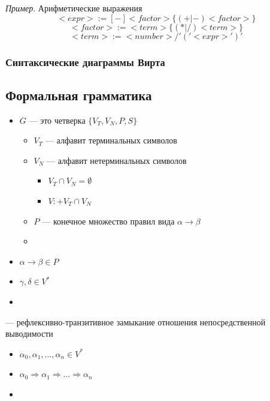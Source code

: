 \documentclass[a4paper, 14pt]{extarticle}
\begin{document}
\textit{Пример}. Арифметические выражения %
\[ <expr> := [-] <factor> \{ (+ | -) <factor> \}  \]
\[ <factor> := <term> \{ (* | /) <term> \} \]
\[ <term> := <number> / '('<expr>')' \]

\subsubsection{Синтаксические диаграммы Вирта}

\subsection{Формальная грамматика}
\begin{itemize}
    \item {} $G$ --- это четверка $\{V_T, V_N, P, S \}$
    \begin{itemize}
        \item $V_T$ --- алфавит терминальных символов
        \item $V_N$ --- алфавит нетерминальных символов
        \begin{itemize}
            \item $ V_T \cap V_N = \emptyset $
            \item $V :+ V_T \cap V_N$
        \end{itemize}
        \item $P$ --- конечное множество правил вида $\alpha \rightarrow \beta$
        \item %
    \end{itemize}
\end{itemize}

\begin{itemize}
    \item $\alpha \rightarrow \beta \in P$
    \item $\gamma, \delta \in V^*$
    \item %
\end{itemize}

 --- рефлексивно-транзитивное замыкание отношения непосредственной выводимости
\begin{itemize}
    \item $\alpha_0, \alpha_1, \ldots, \alpha_n \in V^*$
    \item $\alpha_0 \Rightarrow \alpha_1 \Rightarrow \ldots \Rightarrow \alpha_n$
    \item %
\end{itemize}
\end{document}
